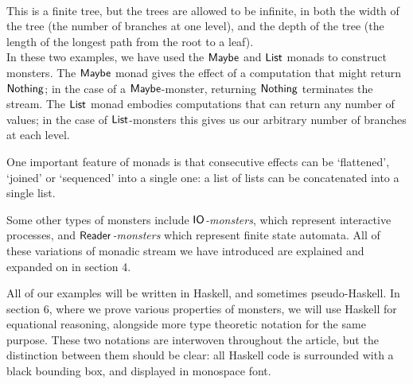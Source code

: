  \\

This is a finite tree, but the trees are allowed to be infinite, in both the width of the tree (the number of branches at one level), and the depth of the tree (the length of the longest path from the root to a leaf). \\

In these two examples, we have used the $\mathsf{Maybe}$ and $\mathsf{List}$ monads to construct monsters.
The $\mathsf{Maybe}$ monad gives the effect of a computation that might return $\mathsf{Nothing}$; in the case of a $\mathsf{Maybe}$-monster, returning $\mathsf{Nothing}$ terminates the stream. 
The $\mathsf{List}$ monad embodies computations that can return any number of values; in the case of $\mathsf{List}$-monsters this gives us our arbitrary number of branches at each level.

One important feature of monads is that consecutive effects can be `flattened', `joined' or `sequenced' into a single one: a list of lists can be concatenated into a single list.

Some other types of monsters include \emph{$\mathsf{IO}$-monsters}, which represent interactive processes, and \emph{$\mathsf{Reader}$-monsters} which represent finite state automata. All of these variations of monadic stream we have introduced are explained and expanded on in section 4.

All of our examples will be written in Haskell, and sometimes pseudo-Haskell. In section 6, where we prove various properties of monsters, we will use Haskell for equational reasoning, alongside more type theoretic notation for the same purpose. These two notations are interwoven throughout the article, but the distinction between them should be clear: all Haskell code is surrounded with a black bounding box, and displayed in monospace font. \\

